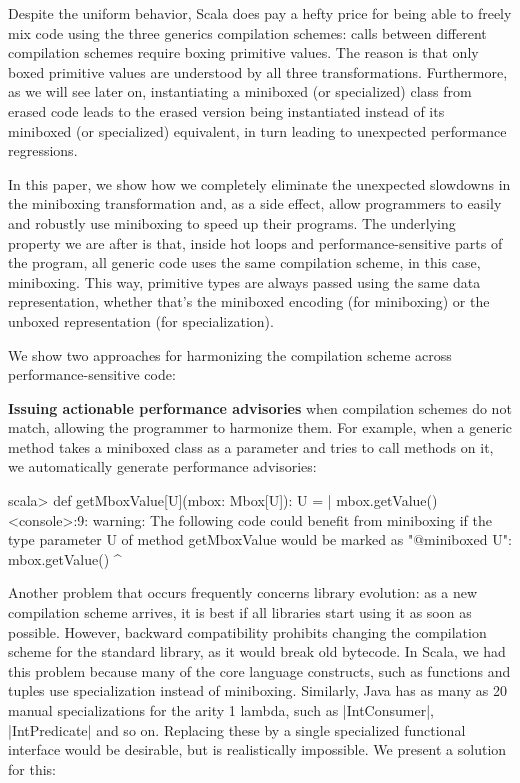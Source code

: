 Despite the uniform behavior, Scala does pay a hefty price for being able to freely mix code using the three generics compilation schemes: calls between different compilation schemes require boxing primitive values. The reason is that only boxed primitive values are understood by all three transformations. Furthermore, as we will see later on, instantiating a miniboxed (or specialized) class from erased code leads to the erased version being instantiated instead of its miniboxed (or specialized) equivalent, in turn leading to unexpected performance regressions.

In this paper, we show how we completely eliminate the unexpected slowdowns in the miniboxing transformation and, as a side effect, allow programmers to easily and robustly use miniboxing to speed up their programs. The underlying property we are after is that, inside hot loops and performance-sensitive parts of the program, all generic code uses the same compilation scheme, in this case, miniboxing. This way, primitive types are always passed using the same data representation, whether that's the miniboxed encoding (for miniboxing) or the unboxed representation (for specialization).

We show two approaches for harmonizing the compilation scheme across performance-sensitive code:

\textbf{Issuing actionable performance advisories} when compilation schemes do not match, allowing the programmer to harmonize them. For example, when a generic method takes a miniboxed class as a parameter and tries to call methods on it, we automatically generate performance advisories:

\begin{lstlisting-nobreak-nolang}
scala> def getMboxValue[U](mbox: Mbox[U]): U =
     |      mbox.getValue()
<console>:9: warning: The following code could benefit from miniboxing if the type parameter U of method getMboxValue would be marked as "@miniboxed U":
         mbox.getValue()
               ^
\end{lstlisting-nobreak-nolang}

Another problem that occurs frequently concerns library evolution: as a new compilation scheme arrives, it is best if all libraries start using it as soon as possible. However, backward compatibility prohibits changing the compilation scheme for the standard library, as it would break old bytecode. In Scala, we had this problem because many of the core language constructs, such as functions and tuples use specialization instead of miniboxing. Similarly, Java has as many as 20 manual specializations for the arity 1 lambda, such as |IntConsumer|, |IntPredicate| and so on. Replacing these by a single specialized functional interface would be desirable, but is realistically impossible. We present a solution for this:

